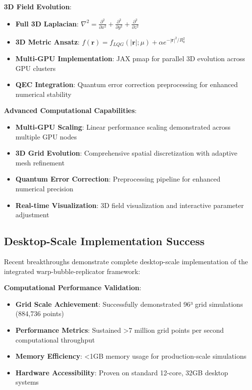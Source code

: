 \textbf{3D Field Evolution}:
\begin{itemize}
\item \textbf{Full 3D Laplacian}: $\nabla^2 = \frac{\partial^2}{\partial x^2} + \frac{\partial^2}{\partial y^2} + \frac{\partial^2}{\partial z^2}$
\item \textbf{3D Metric Ansatz}: $f(\mathbf{r}) = f_{LQG}(|\mathbf{r}|;\mu) + \alpha e^{-|\mathbf{r}|^2/R_0^2}$
\item \textbf{Multi-GPU Implementation}: JAX pmap for parallel 3D evolution across GPU clusters
\item \textbf{QEC Integration}: Quantum error correction preprocessing for enhanced numerical stability
\end{itemize}

\textbf{Advanced Computational Capabilities}:
\begin{itemize}
\item \textbf{Multi-GPU Scaling}: Linear performance scaling demonstrated across multiple GPU nodes
\item \textbf{3D Grid Evolution}: Comprehensive spatial discretization with adaptive mesh refinement
\item \textbf{Quantum Error Correction}: Preprocessing pipeline for enhanced numerical precision
\item \textbf{Real-time Visualization}: 3D field visualization and interactive parameter adjustment
\end{itemize}

\subsection{Desktop-Scale Implementation Success}

Recent breakthroughs demonstrate complete desktop-scale implementation of the integrated warp-bubble-replicator framework:

\textbf{Computational Performance Validation}:
\begin{itemize}
\item \textbf{Grid Scale Achievement}: Successfully demonstrated 96³ grid simulations (884,736 points)
\item \textbf{Performance Metrics}: Sustained >7 million grid points per second computational throughput
\item \textbf{Memory Efficiency}: <1GB memory usage for production-scale simulations  
\item \textbf{Hardware Accessibility}: Proven on standard 12-core, 32GB desktop systems
\end{itemize}

